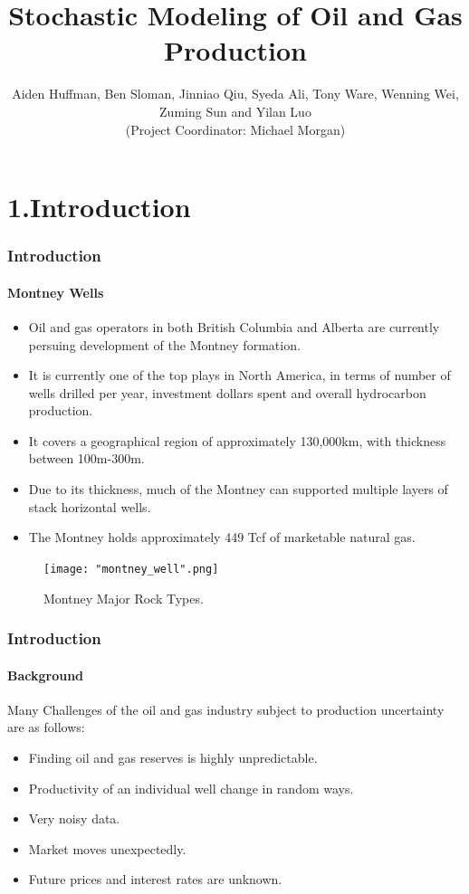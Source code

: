 \documentclass[11pt]{beamer}
\author{Aiden Huffman, Ben Sloman, Jinniao Qiu, Syeda Ali, Tony Ware, Wenning Wei, Zuming Sun and Yilan Luo\\
 (Project Coordinator: Michael Morgan)
}
\title{Stochastic Modeling of Oil and Gas Production
}
\begin{document}
\upshape
\maketitle
\begin{frame}
	\tableofcontents
\end{frame}


\section{1.Introduction}
	\begin{frame}
    	\frametitle{Introduction}
        \framesubtitle{Montney Wells}
        \justifying
       \begin{itemize}
            \item Oil and gas operators in both British Columbia and Alberta are currently persuing development of the Montney formation.
            \item It is currently one of the top plays in North America, in terms of number of wells drilled per year, investment dollars spent and overall hydrocarbon production.
            \item It covers a geographical region of approximately 130,000km, with thickness between 100m-300m.
            \item Due to its thickness, much of the Montney can supported multiple layers of stack horizontal wells.
            \item The Montney holds approximately 449 Tcf of marketable natural gas.
         \end{itemize}
     \end{frame}

\begin{frame}
\begin{figure}
\begin{center}
\texttt{[image: "montney\_well".png]} 
\caption{Montney Major Rock Types.}
\label{smooth}
\end{center}
\end{figure}
	\end{frame}	
	
\begin{frame}
	\frametitle{Introduction}
    \framesubtitle{Background}
Many Challenges of the oil and gas industry subject to production uncertainty are as follows:
\begin{itemize}
\item Finding oil and gas reserves is highly unpredictable.
\item Productivity of an individual well change in random ways.
\item Very noisy data.
\item Market moves unexpectedly.
\item Future prices and interest rates are unknown.
\end{itemize}
\end{frame}
\end{document}

